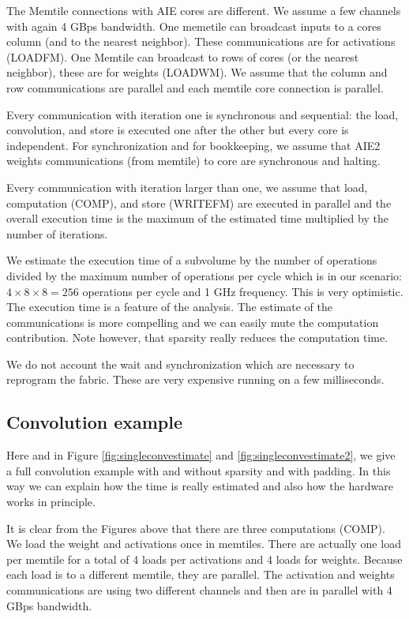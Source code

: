 \documentclass[sigconf]{acmart}
\begin{document}
The Memtile connections with AIE cores are different. We assume a few
channels with again 4 GBps bandwidth. One memetile can broadcast
inputs to a cores column (and to the nearest neighbor). These
communications are for activations (LOADFM). One Memtile can broadcast
to rows of cores (or the nearest neighbor), these are for weights
(LOADWM). We assume that the column and row communications are
parallel and each memtile core connection is parallel.

Every communication with iteration one is synchronous and sequential:
the load, convolution, and store is executed one after the other but
every core is independent.  For synchronization and for bookkeeping,
we assume that AIE2 weights communications (from memtile) to core are
synchronous and halting.

Every communication with iteration larger than one, we assume that
load, computation (COMP), and store (WRITEFM) are executed in parallel
and the overall execution time is the maximum of the estimated time
multiplied by the number of iterations.

We estimate the execution time of a subvolume by the number of
operations divided by the maximum number of operations per cycle which
is in our scenario: $4\times 8 \times 8 = 256 $ operations per cycle
and 1 GHz frequency. This is very optimistic. The execution time is a
feature of the analysis. The estimate of the communications is
more compelling and we can easily mute the computation
contribution. Note however, that sparsity really reduces the
computation time.

We do not account the wait and synchronization which are necessary to
reprogram the fabric. These are very expensive running on a few
milliseconds.


\subsection{Convolution example}
Here and in Figure \ref{fig:singleconvestimate} and
\ref{fig:singleconvestimate2}, we give a full convolution example with
and without sparsity and with padding. In this way we can explain how
the time is really estimated and also how the hardware works in
principle.

It is clear from the Figures above that there are three computations
(COMP). We load the weight and activations once in memtiles. There are
actually one load per memtile for a total of 4 loads per activations
and 4 loads for weights. Because each load is to a different
memtile, they are parallel.  The activation and weights communications
are using two different channels and then are in parallel with 4 GBps
bandwidth.
\end{document}
